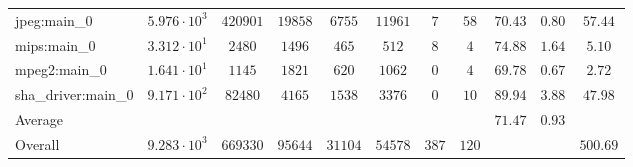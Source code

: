 \begin{tabular}{|l|c|c|c|c|c|c|c|c|c|c|}
jpeg:main\_0            & $ 5.976 \cdot 10^{3} $ & $ 420901 $ & $ 19858 $ & $ 6755  $ & $ 11961 $ & $ 7   $ & $ 58  $ & $ 70.43       $ & $ 0.80    $ & $ 57.44   $ \\
mips:main\_0            & $ 3.312 \cdot 10^{1} $ & $ 2480   $ & $ 1496  $ & $ 465   $ & $ 512   $ & $ 8   $ & $ 4   $ & $ 74.88       $ & $ 1.64    $ & $ 5.10    $ \\
mpeg2:main\_0           & $ 1.641 \cdot 10^{1} $ & $ 1145   $ & $ 1821  $ & $ 620   $ & $ 1062  $ & $ 0   $ & $ 4   $ & $ 69.78       $ & $ 0.67    $ & $ 2.72    $ \\
sha\_driver:main\_0     & $ 9.171 \cdot 10^{2} $ & $ 82480  $ & $ 4165  $ & $ 1538  $ & $ 3376  $ & $ 0   $ & $ 10  $ & $ 89.94       $ & $ 3.88    $ & $ 47.98   $ \\
\hline
Average                 & $                    $ & $        $ & $       $ & $       $ & $       $ & $     $ & $     $ & $ 71.47       $ & $ 0.93    $ & $         $ \\
\hline
Overall                 & $ 9.283 \cdot 10^{3} $ & $ 669330 $ & $ 95644 $ & $ 31104 $ & $ 54578 $ & $ 387 $ & $ 120 $ & $             $ & $         $ & $ 500.69  $ \\
\hline
\end{tabular}
